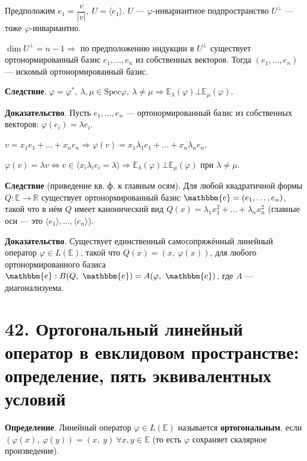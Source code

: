\documentclass[a4paper, 12pt]{article}
\newcommand{\E}{\mathbb{E}}
\newcommand{\R}{\mathbb{R}}
\newcommand{\me}{\mathbbm{e}}
\begin{document}
Предположим $e_1 = \dfrac{v}{|v|},\ U = \langle e_1 \rangle$. $U$ --- $\varphi$-инвариантное подпространство $U^\bot$ --- тоже $\varphi$-инвариантно.

$\dim U^\bot = n - 1 \Rightarrow$ по предположению индукции в $U^\bot$ существует ортонормированный базис $e_1, \ldots, e_n$ из собственных векторов. Тогда $(e_1, \ldots, e_n)$ --- искомый ортонормированный базис.

\vspace{5mm}
\textbf{Следствие}. $\varphi = \varphi^*,\ \lambda, \mu \in \text{Spec}\varphi,\ \lambda \neq \mu \Rightarrow \E_{\lambda}(\varphi) \bot \E_{\mu}(\varphi)$.

\textbf{Доказательство}. Пусть $e_1, \ldots, e_n$ --- ортонормированный базис из собственных векторов: $\varphi(e_i) = \lambda e_i$.

$v = x_1e_1 + \ldots + x_ne_n \Rightarrow \varphi(v) = x_1\lambda_1e_1 + \ldots + x_n\lambda_ne_n$.

$\varphi(v) = \lambda v \Leftrightarrow v \in \langle x_i\lambda_ie_i =\lambda \rangle \Rightarrow \E_{\lambda}(\varphi)\bot\E_{\mu}(\varphi)$ при $\lambda \neq \mu$.

\vspace{5mm}
\textbf{Следствие} (приведение кв. ф. к главным осям). Для любой квадратичной формы $Q: \E \rightarrow \R$ существует ортонормированный базис $\me = (e_1, \ldots, e_n)$, такой что в нём $Q$ имеет канонический вид $Q(x) = \lambda_1x_1^2 + \ldots + \lambda_nx_n^2$ (главные оси --- это $\langle e_1 \rangle, \ldots, \langle e_n \rangle$).

\textbf{Доказательство}. Существует единственный самосопряжённый линейный оператор $\varphi \in L(\E)$, такой что $Q(x) = (x,\ \varphi(x))$, для любого ортонормированного базиса $\me: B(Q,\ \me) = A(\varphi,\ \me)$, где $A$ --- диагонализуема.

\section*{42. Ортогональный линейный оператор в евклидовом пространстве: определение, пять эквивалентных условий}
\textbf{Определение}. Линейный оператор $\varphi \in L(\E)$ называется \textbf{ортогональным}, если $(\varphi(x),\ \varphi(y)) = (x,\ y)\ \forall x, y \in \E$ (то есть $\varphi$ сохраняет скалярное произведение).
\end{document}
